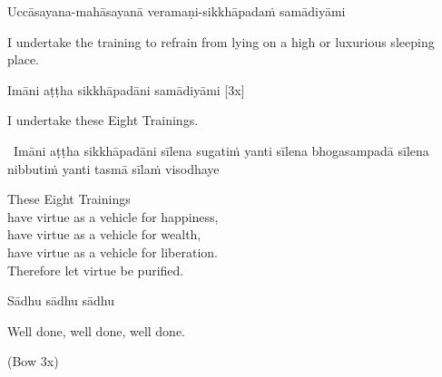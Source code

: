 Uccāsayana-mahāsayanā veramaṇi-sikkhāpadaṁ samādiyāmi

\begin{english-hang}
  I undertake the training to refrain from lying on a high or luxurious sleeping place.
\end{english-hang}

Imāni aṭṭha sikkhāpadāni samādiyāmi \hfill{[3x]}

\begin{english}
  I undertake these Eight Trainings.
\end{english}

\begin{leader-only}
  \anglebracketleft\ \hspace{-0.5mm}Imāni aṭṭha sikkhāpadāni sīlena sugatiṁ yanti sīlena bhogasampadā sīlena nibbutiṁ yanti tasmā sīlaṁ visodhaye \hspace{-0.5mm}\anglebracketright\
\end{leader-only}

\begin{english-verses}
  These Eight Trainings\\
  have virtue as a vehicle for happiness,\\
  have virtue as a vehicle for wealth,\\
  have virtue as a vehicle for liberation.\\
  Therefore let virtue be purified.\makeatletter\hyperlink{endnote144-appendix}\makeatother
\end{english-verses}

Sādhu sādhu sādhu

\begin{english}
  Well done, well done, well done.
\end{english}

\begin{center}
  (Bow 3x)
\end{center}

\clearpage
